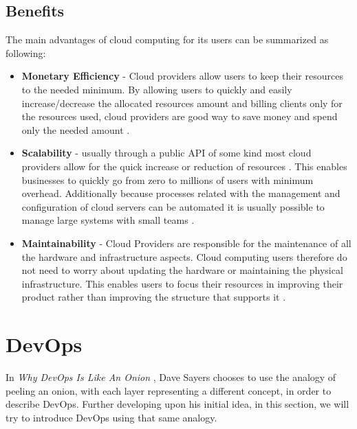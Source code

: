   		\subsection{Benefits} \label{chap:stateoftheheart:sec:cloud:sec:benefits}
  			The main advantages of cloud computing for its users can be summarized as following:
  			\begin{itemize}
  				\item \textbf{Monetary Efficiency} - Cloud providers allow users to keep their resources to the needed minimum. By allowing users to quickly and easily increase/decrease the allocated resources amount and billing clients only for the resources used, cloud providers are good way to save money and spend only the needed amount \cite{Garrison2012,Mell2011}.
  				\item \textbf{Scalability} - usually through a public API of some kind most cloud providers allow for the quick increase or reduction of resources \cite{Mell2011}. This enables businesses to quickly go from zero to millions of users with minimum overhead. Additionally because processes related with the management and configuration of cloud servers can be automated it is usually possible to manage large systems with small teams \cite{Loukides2012}.
  	    	\item \textbf{Maintainability} - Cloud Providers are responsible for the maintenance of all the hardware and infrastructure aspects. Cloud computing users therefore do not need to worry about updating the hardware or maintaining the physical infrastructure. This enables users to focus their resources in improving their product rather than improving the structure that supports it \cite{Garrison2012}.
  			\end{itemize}

	\section{DevOps} \label{chap:stateoftheart:sec:devops}
      In \textit{Why DevOps Is Like An Onion} \cite{DaveSayers2013}, Dave Sayers chooses to use the analogy of peeling an onion, with each layer representing a different concept, in order to describe DevOps. Further developing upon his initial idea, in this section, we will try to introduce DevOps using that same analogy.

